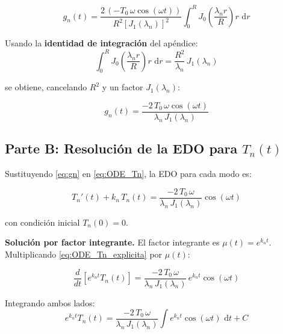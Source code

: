 \documentclass[12pt, a4paper]{article}
\newenvironment{resultado}[1][]{%
  \begin{tcolorbox}[resultadoestilo, title={#1}]%
}{%
  \end{tcolorbox}%
}
\newcommand{\dd}{\,\mathrm{d}}
\begin{document}
\begin{equation}
  g_n(t) = \frac{2\,(-T_0\,\omega\cos(\omega t))}{R^2\left[J_1(\lambda_n)\right]^2}
  \int_0^R J_0\!\left(\frac{\lambda_n r}{R}\right) r\,\dd r
\end{equation}

Usando la \textbf{identidad de integración} del apéndice:
\begin{equation}
  \int_0^R J_0\!\left(\frac{\lambda_n r}{R}\right) r\,\dd r = \frac{R^2}{\lambda_n}\,J_1(\lambda_n)
\end{equation}

se obtiene, cancelando $R^2$ y un factor $J_1(\lambda_n)$:

\begin{resultado}[Coeficiente $g_n(t)$]
\begin{equation}
  g_n(t) = \frac{-2\,T_0\,\omega\cos(\omega t)}{\lambda_n\, J_1(\lambda_n)}
  \label{eq:gn}
\end{equation}
\end{resultado}

\subsection{Parte B: Resolución de la EDO para \texorpdfstring{$T_n(t)$}{Tn(t)}}

Sustituyendo \eqref{eq:gn} en \eqref{eq:ODE_Tn}, la EDO para cada modo es:

\begin{equation}
  T_n'(t) + k_n\, T_n(t) = \frac{-2\,T_0\,\omega}{\lambda_n\,J_1(\lambda_n)}\cos(\omega t)
  \label{eq:ODE_Tn_explicita}
\end{equation}

con condición inicial $T_n(0) = 0$.

\medskip
\noindent\textbf{Solución por factor integrante.} El factor integrante es $\mu(t) = e^{k_n t}$.
Multiplicando \eqref{eq:ODE_Tn_explicita} por $\mu(t)$:

\begin{equation}
  \frac{d}{dt}\!\left[e^{k_n t} T_n(t)\right]
  = \frac{-2\,T_0\,\omega}{\lambda_n\,J_1(\lambda_n)}\,e^{k_n t}\cos(\omega t)
\end{equation}

Integrando ambos lados:
\begin{equation}
  e^{k_n t} T_n(t)
  = \frac{-2\,T_0\,\omega}{\lambda_n\,J_1(\lambda_n)}
    \int e^{k_n t}\cos(\omega t)\,\dd t + C
\end{equation}
\end{document}
